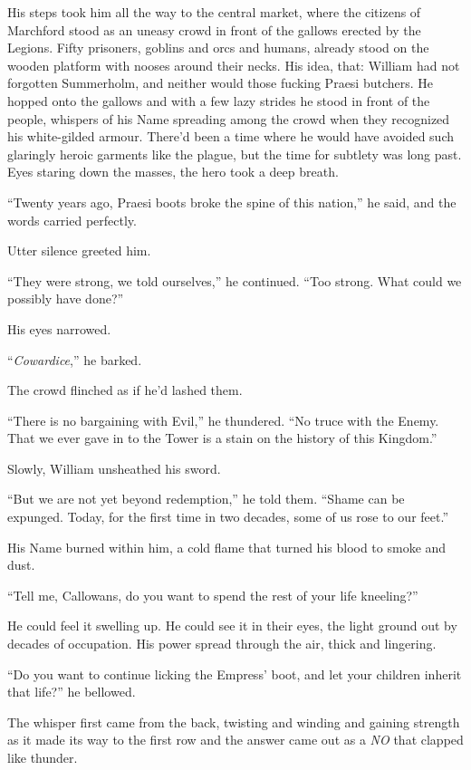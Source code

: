 \documentclass[12pt, openany]{book}
\begin{document}
His steps took him all the way to the central market, where the citizens of Marchford stood as an uneasy crowd in front of the gallows erected by the Legions. Fifty prisoners, goblins and orcs and humans, already stood on the wooden platform with nooses around their necks. His idea, that: William had not forgotten Summerholm, and neither would those fucking Praesi butchers. He hopped onto the gallows and with a few lazy strides he stood in front of the people, whispers of his Name spreading among the crowd when they recognized his white-gilded armour. There’d been a time where he would have avoided such glaringly heroic garments like the plague, but the time for subtlety was long past. Eyes staring down the masses, the hero took a deep breath.

“Twenty years ago, Praesi boots broke the spine of this nation,” he said, and the words carried perfectly.

Utter silence greeted him.

“They were strong, we told ourselves,” he continued. “Too strong. What could we possibly have done?”

His eyes narrowed.

“\textit{Cowardice},” he barked.

The crowd flinched as if he’d lashed them.

“There is no bargaining with Evil,” he thundered. “No truce with the Enemy. That we ever gave in to the Tower is a stain on the history of this Kingdom.”

Slowly, William unsheathed his sword.

“But we are not yet beyond redemption,” he told them. “Shame can be expunged. Today, for the first time in two decades, some of us rose to our feet.”

His Name burned within him, a cold flame that turned his blood to smoke and dust.

“Tell me, Callowans, do you want to spend the rest of your life kneeling?”

He could feel it swelling up. He could see it in their eyes, the light ground out by decades of occupation. His power spread through the air, thick and lingering.

“Do you want to continue licking the Empress’ boot, and let your children inherit that life?” he bellowed.

The whisper first came from the back, twisting and winding and gaining strength as it made its way to the first row and the answer came out as a \textit{NO} that clapped like thunder.
\end{document}
